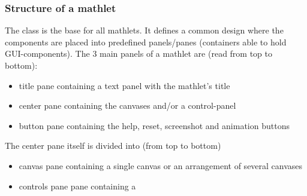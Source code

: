   \subsubsection{Structure of a mathlet}
  The class  is the base for all mathlets.
  It defines a common design where the components
  are placed into predefined panels/panes (containers able to hold GUI-components).
  The 3 main panels of a mathlet are (read from top to bottom):
  \begin{itemize}
    \item title pane containing a text panel with the mathlet's title
    \item center pane containing the canvases and/or a control-panel
    \item button pane containing the help, reset, screenshot and animation buttons
  \end{itemize}
  The center pane itself is divided into (from top to bottom)
  \begin{itemize}
    \item canvas pane containing a single canvas or an arrangement of several canvases
    \item controls pane pane containing a \cp
  \end{itemize}

